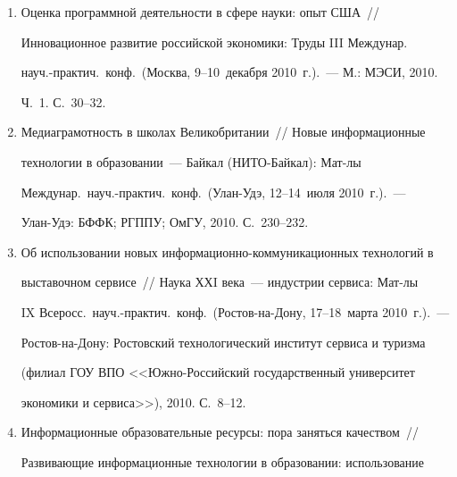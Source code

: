 \begin{enumerate}[1.]
Исследование инновационного потенциала Российской академии наук и его 


влияние на развитие технологий~/\!\!/  Инновационное развитие российской 


экономики: Труды III Междунар.\ науч.-практич.\ конф.\ (Москва, 9--10~декабря 2010~г.).~--- 


М.: МЭСИ, 2010. Ч.~1. С.~27--30.


\item{}


Оценка программной деятельности в сфере науки: опыт США~/\!\!/  


Инновационное развитие российской экономики: Труды III Междунар.\ 


науч.-практич.\ конф.\  (Москва, 9--10~декабря 2010~г.).~--- М.: МЭСИ, 2010. 


Ч.~1. С.~30--32.


\item{}


Медиаграмотность в школах Великобритании~/\!\!/  Новые информационные 


технологии в образовании~--- Байкал (НИТО-Байкал): Мат-лы 


Междунар.\ науч.-практич.\ конф.\  (Улан-Удэ, 12--14~июля 2010~г.).~--- 


Улан-Удэ: БФФК; РГППУ; ОмГУ, 2010. С.~230--232.


\item{}


Об использовании новых ин\-фор\-ма\-ци\-он\-но-ком\-му\-ни\-ка\-ци\-он\-ных  технологий в 


выставочном сервисе~/\!\!/  Наука ХХI века~--- индустрии сервиса: Мат-лы 


IX Всеросс.\  науч.-практич.\ конф.\  (Ростов-на-Дону, 17--18~марта 2010~г.).~--- 


Ростов-на-Дону: Ростовский технологический институт сервиса и туризма 


(филиал ГОУ ВПО <<Южно-Российский государственный университет 


экономики и сервиса>>), 2010. С.~8--12.


\item {}


Информационные образовательные ресурсы: пора заняться качеством~/\!\!/  


Развивающие информационные технологии в образовании: использование 



\end{enumerate}
